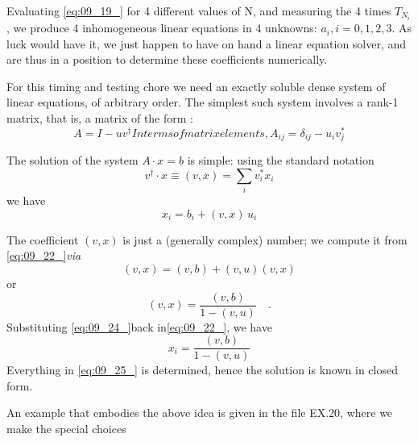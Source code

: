 Evaluating \ref{eq:09_19_} for 4 different values of N, and measuring the 4
times $T_{N_i}$ , we produce 4 inhomogeneous linear equations in 4 
unknowns: $a_i , i = 0, 1, 2, 3$. As luck would have it, we just happen to have on hand a linear equation solver, and are thus in a
position to determine these coefficients numerically.

For this timing and testing chore we need an exactly soluble dense
system of linear equations, of arbitrary order. The simplest such
system involves a rank-1 matrix, that is, a matrix of the form :
\begin{subequations}
\begin{equation}
 \label{eq:09_20_}
A = I - u v^\dagger
\end{equation}
In terms of matrix elements,

\begin{equation}
 \label{eq:09_20prime_}
	A_{ij} = \delta_{ij} - u_i v_j^*
\end{equation}
\end{subequations}

The solution of the system $A\cdot x = b$ is simple: using the standard
notation
\begin{equation}
 \label{eq:09_21_}
	v^\dagger \cdot x \equiv (v,x) = \sum_{i}v_i^*x_i
\end{equation}
we have
\begin{equation}
 \label{eq:09_22_}
	x_i = b_i + (v,x)\,u_i
\end{equation}

The coefficient $(v, x)$ is just a (generally complex) number; we
compute it from \ref{eq:09_22_}\textit{via}
\begin{equation}
 \label{eq:09_23_}
	(v,x)=(v,b)+(v,u)(v,x)
\end{equation}
or
\begin{equation}
 \label{eq:09_24_}
	(v,x)=\frac{(v,b)}{1-(v,u)}\quad .
\end{equation}
Substituting \ref{eq:09_24_}back in\ref{eq:09_22_}, we have
\begin{equation}
 \label{eq:09_25_}
	x_i=\frac{(v,b)}{1-(v,u)}
\end{equation}
Everything in \ref{eq:09_25_} is determined, hence the solution is known in
closed form.

An example that embodies the above idea is given in the file
EX.20, where we make the special choices

